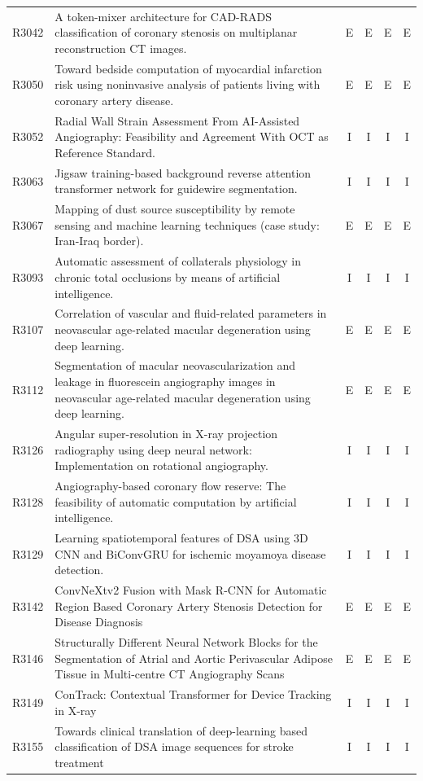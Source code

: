 \begin{longtable}{@{}l p{8.6cm} c c c c@{}}
R3042 & A token-mixer architecture for CAD-RADS classification of coronary stenosis on multiplanar reconstruction CT images. & E & E & E & E \\
R3050 & Toward bedside computation of myocardial infarction risk using noninvasive analysis of patients living with coronary artery disease. & E & E & E & E \\
R3052 & Radial Wall Strain Assessment From AI-Assisted Angiography: Feasibility and Agreement With OCT as Reference Standard. & I & I & I & I \\
R3063 & Jigsaw training-based background reverse attention transformer network for guidewire segmentation. & I & I & I & I \\
R3067 & Mapping of dust source susceptibility by remote sensing and machine learning techniques (case study: Iran-Iraq border). & E & E & E & E \\
R3093 & Automatic assessment of collaterals physiology in chronic total occlusions by means of artificial intelligence. & I & I & I & I \\
R3107 & Correlation of vascular and fluid-related parameters in neovascular age-related macular degeneration using deep learning. & E & E & E & E \\
R3112 & Segmentation of macular neovascularization and leakage in fluorescein angiography images in neovascular age-related macular degeneration using deep learning. & E & E & E & E \\
R3126 & Angular super-resolution in X-ray projection radiography using deep neural network: Implementation on rotational angiography. & I & I & I & I \\
R3128 & Angiography-based coronary flow reserve: The feasibility of automatic computation by artificial intelligence. & I & I & I & I \\
R3129 & Learning spatiotemporal features of DSA using 3D CNN and BiConvGRU for ischemic moyamoya disease detection. & I & I & I & I \\
R3142 & ConvNeXtv2 Fusion with Mask R-CNN for Automatic Region Based Coronary Artery Stenosis Detection for Disease Diagnosis & E & E & E & E \\
R3146 & Structurally Different Neural Network Blocks for the Segmentation of Atrial and Aortic Perivascular Adipose Tissue in Multi-centre CT Angiography Scans & E & E & E & E \\
R3149 & ConTrack: Contextual Transformer for Device Tracking in X-ray & I & I & I & I \\
R3155 & Towards clinical translation of deep-learning based classification of DSA image sequences for stroke treatment & I & I & I & I \\

\end{longtable}
